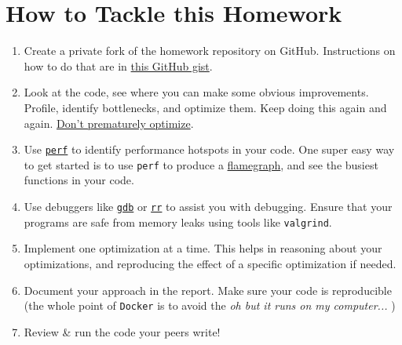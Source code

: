 \documentclass[11pt]{article}
\newcommand{\1}{ \mathbb{1} }
\begin{document}
\section{How to Tackle this Homework}
\begin{enumerate}
    \item Create a private fork of the homework repository on GitHub. Instructions on how to do that are in \href{https://gist.github.com/vimarsh6739/d920781b429f1ef8ec559e62aecd0e12}{this GitHub gist}. 
    \item Look at the code, see where you can make some obvious improvements. Profile, identify bottlenecks, and optimize them. Keep doing this again and again. \href{https://martin.leyrer.priv.at/y2022/m09/premature_optimisation.html}{Don't prematurely optimize}. 
    \item Use \href{https://www.brendangregg.com/perf.html}{\texttt{perf}} to identify performance hotspots in your code. One super easy way to get started is to use \texttt{perf} to produce a \href{https://www.brendangregg.com/FlameGraphs/cpuflamegraphs.html}{flamegraph}, and see the busiest functions in your code.
    \item Use debuggers like \href{https://sourceware.org/gdb/}{\texttt{gdb}} or \href{https://rr-project.org/}{\texttt{rr}} to assist you with debugging. Ensure that your programs are safe from memory leaks using tools like \texttt{valgrind}.  
    \item Implement one optimization at a time. This helps in reasoning about your optimizations, and reproducing the effect of a specific optimization if needed. 
    \item Document your approach in the report. Make sure your code is reproducible (the whole point of \texttt{Docker} is to avoid the \textit{oh but it runs on my computer...} )
    \item Review \& run the code your peers write!
\end{enumerate}
\end{document}
